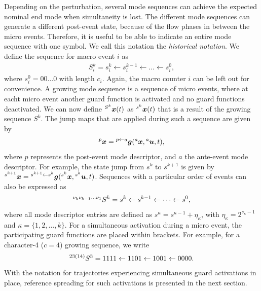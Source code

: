 \documentclass[../DC2017114Bouma.tex]{subfiles}
\begin{document}
Depending on the perturbation, several mode sequences can achieve the expected nominal end mode when simultaneity is lost. The different mode sequences can generate a different post-event state, because of the flow phases in between the micro events. Therefore, it is useful to be able to indicate an entire mode sequence with one symbol. We call this notation the \textit{historical notation}. We define the sequence for macro event $i$ as 
\begin{align}
S^k_i = s^k_i\leftarrow s^{k-1}_i\leftarrow \dots \leftarrow s^0_i,
\end{align}
where $s^0_i = 00\dots0$ with length $c_i$. Again, the macro counter $i$ can be left out for convenience. A growing mode sequence is a sequence of micro events, where at eacht micro event another guard function is activated and no guard functions deactivated. We can now define $\hspace{0cm}^{S^k}{\boldsymbol{x}}(t)$ as $\hspace{0cm}^{s^k}{\boldsymbol{x}}(t)$ that is a result of the growing sequence $S^k$. The jump maps that are applied during such a sequence are given by
\begin{align}
\hspace{0cm}^{p}{\boldsymbol{x}} = \hspace{0cm}^{p\leftarrow a}{\boldsymbol{g}}(\hspace{0cm}^{a}{\boldsymbol{x}},\hspace{0cm}^{a}{\boldsymbol{u}},t),
\end{align}
where $p$ represents the post-event mode descriptor, and $a$ the ante-event mode descriptor. For example, the state jump from $s^k$ to $s^{k+1}$ is given by $\hspace{0cm}^{s^{k+1}}{\boldsymbol{x}} = \hspace{0cm}^{s^{k+1}\leftarrow s^k}{\boldsymbol{g}}(\hspace{0cm}^{s^k}{\boldsymbol{x}},\hspace{0cm}^{s^k}{\boldsymbol{u}},t)$. Sequences with a particular order of events can also be expressed as
\begin{align}
\hspace{0cm}^{\nu_k \nu_{k-1}\dots\nu_{1}}S^k = s^k \leftarrow s^{k-1} \leftarrow \dots \leftarrow s^0,
\end{align}
where all mode descriptor entries are defined as $s^{\kappa} = s^{\kappa-1} + \eta_{\kappa}$, with $\eta_{\kappa} = 2^{\nu_{\kappa}-1}$ and $\kappa = \{1,2,\dots,k\}$. For a simultaneous activation during a micro event, the participating guard functions are placed within brackets. For example, for a character-4 ($c = 4$) growing sequence, we write 
\begin{align}
\hspace{0cm}^{23(14)}S^3 = 1111 \leftarrow 1101 \leftarrow 1001 \leftarrow 0000.
\end{align}
%
With the notation for trajectories experiencing simultaneous guard activations in place, reference spreading for such activations is presented in the next section.
\end{document}
